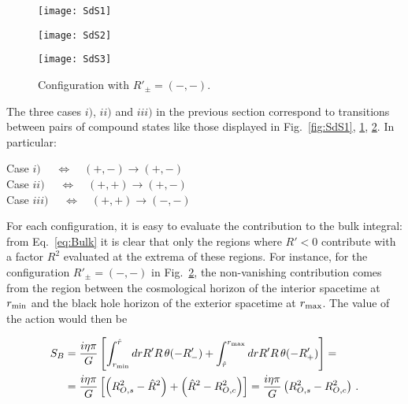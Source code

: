 \documentclass[a4paper,11pt]{article}
\numberwithin{equation}{section}
\numberwithin{equation}{section}
\begin{document}
\begin{figure}
\centering
\begin{minipage}{.5\textwidth}
  \centering
  \texttt{[image: SdS1]}
  \label{fig:SdS1}
\end{minipage}%
\begin{minipage}{.5\textwidth}
  \centering
  \texttt{[image: SdS2]}
  \label{fig:SdS2}
\end{minipage}
\end{figure}

\begin{figure}[h!] 
\begin{center} 
\texttt{[image: SdS3]}
\caption{\footnotesize{Configuration with $R'_\pm = (-,-)$.} \label{fig:SdS3}}
\end{center} 
\end{figure}

The three cases $i)$, $ii)$ and $iii)$ in the previous section correspond to transitions between pairs of compound states like those displayed in Fig.~\ref{fig:SdS1}, \ref{fig:SdS2}, \ref{fig:SdS3}. In particular:
\begin{center}
Case $i)$ $\quad \Leftrightarrow \quad (+,-) \rightarrow (+, -)$ \\
Case $ii)$ $\quad \Leftrightarrow \quad (+,+) \rightarrow (+, -)$ \\
Case $iii)$ $\quad \Leftrightarrow \quad (+,+) \rightarrow (-, -)$
\end{center}

For each configuration, it is easy to evaluate the contribution to the bulk integral: from Eq.~\eqref{eq:Bulk} it is clear that only the regions where $R'<0$ contribute with a factor $R^2$ evaluated at the extrema of these regions. For instance, for the configuration $R'_\pm = (-, -)$ in Fig.~\ref{fig:SdS3}, the non-vanishing contribution comes from the region between the cosmological horizon of the interior spacetime at $r_{\rm min}$ and the black hole horizon of the exterior spacetime at $r_{\rm max}$. The value of the action would then be

\begin{align}
S_B &= \frac{i \eta \pi}{G} \left[\int_{r_{\rm min}}^{\hat{r}} dr R' R \, \theta(-R'_-) + \int_{\hat{r}}^{r_{\rm max}} dr R' R \, \theta(-R'_+)\right] = \\
&= \frac{i \eta \pi}{G} \left[\left(R_{O, s}^2 - \hat{R}^2\right) + \left(\hat{R}^2 - R_{O, c}^2\right)\right] = \frac{i \eta \pi}{G} \left(R_{O, s}^2 - R_{O, c}^2\right) \,.
\end{align}
\end{document}
